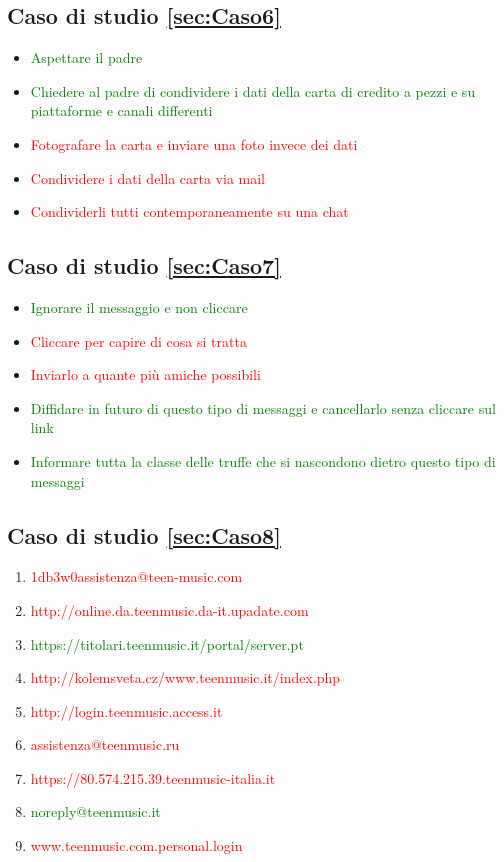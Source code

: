 \documentclass{article}
\begin{document}
\subsection{Caso di studio \ref{sec:Caso6}}
\begin{itemize}
	\item \textcolor{green}{Aspettare il padre}		
	\item \textcolor{green}{Chiedere al padre di condividere i dati della carta di credito a pezzi e su piattaforme e canali differenti	}	
	\item \textcolor{red}{Fotografare la carta e inviare una foto invece dei dati}	
	\item \textcolor{red}{Condividere i dati della carta via mail}	
	\item \textcolor{red}{Condividerli tutti contemporaneamente su una chat}
\end{itemize}
\subsection{Caso di studio \ref{sec:Caso7}}
\begin{itemize}
	\item \textcolor{green}{Ignorare il messaggio e non cliccare}
	\item \textcolor{red}{Cliccare per capire di cosa si tratta}
	\item \textcolor{red}{Inviarlo a quante più amiche possibili}		
	\item \textcolor{green}{Diffidare in futuro di questo tipo di messaggi e cancellarlo senza cliccare sul link}	
	\item \textcolor{green}{Informare tutta la classe delle truffe che si nascondono dietro questo tipo di messaggi}
\end{itemize}
\subsection{Caso di studio \ref{sec:Caso8}}
\begin{enumerate}
	\item \textcolor{red}{1db3w0assistenza@teen-music.com}		
	\item \textcolor{red}{http://online.da.teenmusic.da-it.upadate.com}
	\item \textcolor{green}{https://titolari.teenmusic.it/portal/server.pt}	
	\item \textcolor{red}{http://kolemsveta.cz/www.teenmusic.it/index.php}	
	\item \textcolor{red}{http://login.teenmusic.access.it}		
	\item  \textcolor{red}{assistenza@teenmusic.ru}		
	\item \textcolor{red}{https://80.574.215.39.teenmusic-italia.it}
	\item \textcolor{green}{noreply@teenmusic.it}		
	\item \textcolor{red}{www.teenmusic.com.personal.login}
\end{enumerate}
\end{document}
